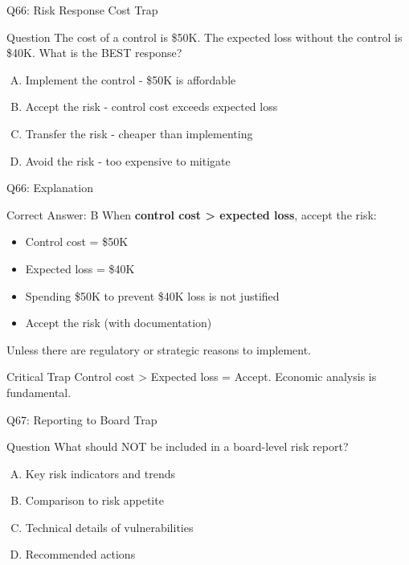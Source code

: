 \documentclass{beamer}
\begin{document}
	\begin{frame}{Q66: Risk Response Cost Trap}
		\begin{block}{Question}
			The cost of a control is \$50K. The expected loss without the control is \$40K. What is the BEST response?
		\end{block}
		\begin{enumerate}[(A)]
			\item Implement the control - \$50K is affordable
			\item Accept the risk - control cost exceeds expected loss
			\item Transfer the risk - cheaper than implementing
			\item Avoid the risk - too expensive to mitigate
		\end{enumerate}
	\end{frame}
	
	\begin{frame}{Q66: Explanation}
		\begin{block}{Correct Answer: B}
			When \textbf{control cost > expected loss}, accept the risk:
			\begin{itemize}
				\item Control cost = \$50K
				\item Expected loss = \$40K
				\item Spending \$50K to prevent \$40K loss is not justified
				\item Accept the risk (with documentation)
			\end{itemize}
			Unless there are regulatory or strategic reasons to implement.
		\end{block}
		\begin{alertblock}{Critical Trap}
			Control cost > Expected loss = Accept.
			Economic analysis is fundamental.
		\end{alertblock}
	\end{frame}
	
	\begin{frame}{Q67: Reporting to Board Trap}
		\begin{block}{Question}
			What should NOT be included in a board-level risk report?
		\end{block}
		\begin{enumerate}[(A)]
			\item Key risk indicators and trends
			\item Comparison to risk appetite
			\item Technical details of vulnerabilities
			\item Recommended actions
		\end{enumerate}
	\end{frame}
	
\end{document}
